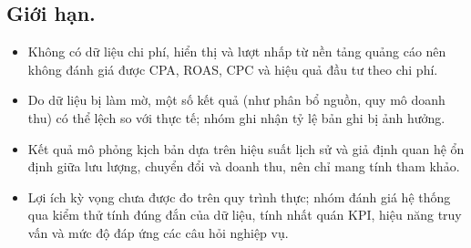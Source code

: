 \subsection*{Giới hạn.}
\begin{itemize}
    \item Không có dữ liệu chi phí, hiển thị và lượt nhấp từ nền tảng quảng cáo nên không đánh giá được CPA, ROAS, CPC và hiệu quả đầu tư theo chi phí.

    \item Do dữ liệu bị làm mờ, một số kết quả (như phân bổ nguồn, quy mô doanh thu) có thể lệch so với thực tế; nhóm ghi nhận tỷ lệ bản ghi bị ảnh hưởng.

    \item Kết quả mô phỏng kịch bản dựa trên hiệu suất lịch sử và giả định quan hệ ổn định giữa lưu lượng, chuyển đổi và doanh thu, nên chỉ mang tính tham khảo.

    \item Lợi ích kỳ vọng chưa được đo trên quy trình thực; nhóm đánh giá hệ thống qua kiểm thử tính đúng đắn của dữ liệu, tính nhất quán KPI, hiệu năng truy vấn và mức độ đáp ứng các câu hỏi nghiệp vụ.
\end{itemize}
